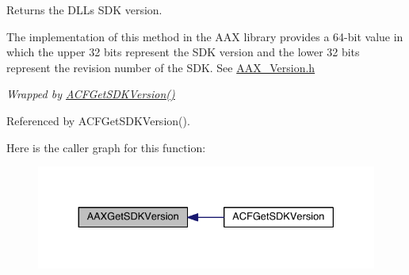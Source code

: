 Returns the D\+L\+L\textquotesingle{}s S\+D\+K version. 

The implementation of this method in the A\+A\+X library provides a 64-\/bit value in which the upper 32 bits represent the S\+D\+K version and the lower 32 bits represent the revision number of the S\+D\+K. See \hyperlink{a00308}{A\+A\+X\+\_\+\+Version.\+h}

{\itshape Wrapped by \hyperlink{a00209_a2a47c5f7e29baf716a4c4956389e83c9}{A\+C\+F\+Get\+S\+D\+K\+Version()} } 

Referenced by A\+C\+F\+Get\+S\+D\+K\+Version().



Here is the caller graph for this function\+:
\nopagebreak
\begin{figure}[H]
\begin{center}
\leavevmode
\includegraphics[width=330pt]{a00253_a6a9bb35afab5850f43b0f8f9ce2df6ef_icgraph}
\end{center}
\end{figure}


